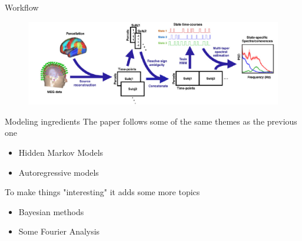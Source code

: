 \documentclass{beamer}
\begin{document}
	
%		
%		
%		
%	
%	
	\begin{frame}{Workflow}
	
		
		\begin{figure}[h]
			\centering
				\includegraphics[scale=0.5]{../Figures/fig_vidaurre2_1.png}
		\end{figure}
	\end{frame}
\begin{frame}{Modeling ingredients}
	The paper follows some of the same themes as the previous one
	\begin{itemize}
		\item Hidden Markov Models
		\item Autoregressive models
	\end{itemize}
To make things "interesting" it adds some more topics
\begin{itemize}
	\item Bayesian methods
	\item Some Fourier Analysis
\end{itemize}

\end{frame}
\end{document}
